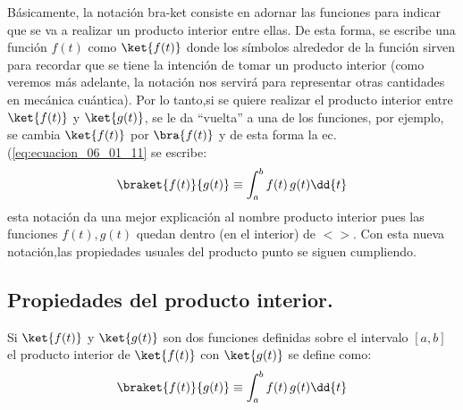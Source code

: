 Básicamente, la notación bra-ket consiste en adornar las funciones para indicar que se va a realizar un producto interior entre ellas. De esta forma, se escribe una función $f(t)$ como $\ket{f(t)}$ donde los símbolos alrededor de la función sirven para recordar que se tiene la intención de tomar un producto interior (como veremos más adelante, la notación nos servirá para representar otras cantidades en mecánica cuántica). Por lo tanto,si se quiere realizar el producto interior entre $\ket{f(t)}$ y $\ket{g(t)}$, se le da \enquote{vuelta} a una de los funciones, por ejemplo, se cambia $\ket{f(t)}$ por $\bra{f(t)}$ y de esta forma la ec. (\ref{eq:ecuacion_06_01_11} se escribe:
\begin{align}
\braket{f(t)}{g(t)} \equiv \int_{a}^{b} f(t) \, g(t) \dd{t}
\label{eq:ecuacion_06_01_12}
\end{align}
esta notación da una mejor explicación al nombre producto interior pues las funciones $f(t), g(t)$ quedan dentro (en el interior) de $< >$. Con esta nueva notación,las propiedades usuales del producto punto se siguen cumpliendo.

\subsection{Propiedades del producto interior.}

Si $\ket{f(t)}$ y $\ket{g(t)}$ son dos funciones definidas sobre el intervalo $[a, b]$ el producto interior de $\ket{f(t)}$ con $\ket{g(t)}$ se define como:
\begin{align}
\braket{f(t)}{g(t)} \equiv \int_{a}^{b} f(t) \, g(t) \dd{t}
\label{eq:ecuacion_06_10_13}
\end{align}

